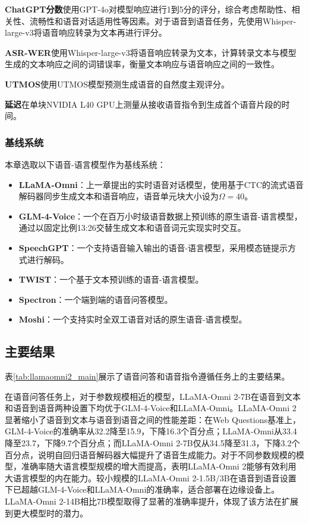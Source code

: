 \textbf{ChatGPT分数}\quad 使用GPT-4o\citep{gpt4o}对模型响应进行1到5分的评分，综合考虑帮助性、相关性、流畅性和语音对话适用性等因素。对于语音到语音任务，先使用Whisper-large-v3将语音响应转录为文本再进行评分。

\textbf{ASR-WER}\quad 使用Whisper-large-v3将语音响应转录为文本，计算转录文本与模型生成的文本响应之间的词错误率，衡量文本响应与语音响应之间的一致性。

\textbf{UTMOS}\quad 使用UTMOS\citep{saeki22c_interspeech}模型预测生成语音的自然度主观评分。

\textbf{延迟}\quad 在单块NVIDIA L40 GPU上测量从接收语音指令到生成首个语音片段的时间。

\subsubsection{基线系统}

本章选取以下语音-语言模型作为基线系统：
\begin{itemize}
    \item \textbf{LLaMA-Omni}\citep{fang2025llamaomni}：上一章提出的实时语音对话模型，使用基于CTC的流式语音解码器同步生成文本和语音响应，语音单元块大小设为$\Omega = 40$。
    \item \textbf{GLM-4-Voice}\citep{glm4voice}：一个在百万小时级语音数据上预训练的原生语音-语言模型，通过以固定比例13:26交替生成文本和语音词元实现实时交互。
    \item \textbf{SpeechGPT}\citep{zhang-etal-2023-speechgpt}：一个支持语音输入输出的语音-语言模型，采用模态链提示方式进行解码。
    \item \textbf{TWIST}\citep{twist}：一个基于文本预训练的语音-语言模型。
    \item \textbf{Spectron}\citep{nachmani2024spoken}：一个端到端的语音问答模型。
    \item \textbf{Moshi}\citep{kyutai2024moshi}：一个支持实时全双工语音对话的原生语音-语言模型。
\end{itemize}

\subsection{主要结果}



表\ref{tab:llamaomni2_main}展示了语音问答和语音指令遵循任务上的主要结果。

在语音问答任务上，对于参数规模相近的模型，LLaMA-Omni 2-7B在语音到文本和语音到语音两种设置下均优于GLM-4-Voice和LLaMA-Omni。LLaMA-Omni 2显著缩小了语音到文本与语音到语音之间的性能差距：在Web Questions基准上，GLM-4-Voice的准确率从32.2降至15.9，下降16.3个百分点；LLaMA-Omni从33.4降至23.7，下降9.7个百分点；而LLaMA-Omni 2-7B仅从34.5降至31.3，下降3.2个百分点，说明自回归语音解码器大幅提升了语音生成能力。对于不同参数规模的模型，准确率随大语言模型规模的增大而提高，表明LLaMA-Omni 2能够有效利用大语言模型的内在能力。较小规模的LLaMA-Omni 2-1.5B/3B在语音到语音设置下已超越GLM-4-Voice和LLaMA-Omni的准确率，适合部署在边缘设备上。LLaMA-Omni 2-14B相比7B模型取得了显著的准确率提升，体现了该方法在扩展到更大模型时的潜力。

